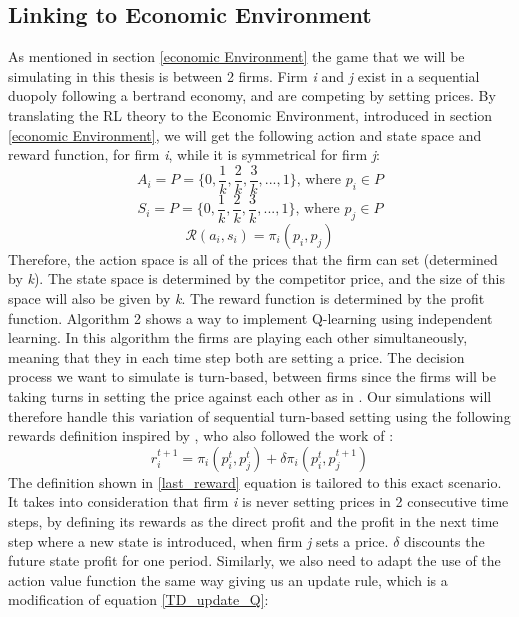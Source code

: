 \documentclass{article}
\begin{document}
\subsection{Linking to Economic Environment}
\label{siste Q teori afsnit}
As mentioned in section \ref{economic Environment} the game that we will be simulating in this thesis is between 2 firms. Firm \textit{i} and \textit{j} exist in a sequential duopoly following a bertrand economy, and are competing by setting prices.
By translating the RL theory to the Economic Environment, introduced in section \ref{economic Environment}, we will get the following action and state space and reward function, for firm \textit{i}, while it is symmetrical for firm \textit{j}:
$$A_i = P = \{0, \frac{1}{k}, \frac{2}{k}, \frac{3}{k},...,1\} \text{,  where }p_i\in P$$
$$S_i=P=\{0, \frac{1}{k}, \frac{2}{k}, \frac{3}{k},...,1\} \text{,  where }p_j\in P$$ 
$$\mathcal{R}(a_i,s_i) = \pi_i(p_i,p_j)$$
Therefore, the action space is all of the prices that the firm can set (determined by \textit{k}). The state space is determined by the competitor price, and the size of this space will also be given by \textit{k}. The reward function is determined by the profit function.
\newline
Algorithm 2 shows a way to implement Q-learning using independent learning. In this algorithm the firms are playing each other simultaneously, meaning that they in each time step both are setting a price. 
The decision process we want to simulate is turn-based, between firms since the firms will be taking turns in setting the price against each other as in \cite{Klein2021}. 
\newline 
Our simulations will therefore handle this variation of sequential turn-based setting using the following rewards definition inspired by \cite{Julius2023}, who also followed the work of \cite{Klein2021}: 
\begin{equation}
\label{last_reward}
    r_i^{t+1} = \pi_i(p^t_i,p^t_j) + \delta\pi_i(p_i^t,p_j^{t+1})
\end{equation}
The definition shown in \ref{last_reward} equation is tailored to this exact scenario. It takes into consideration that firm \textit{i} is never setting prices in 2 consecutive time steps, by defining its rewards as the direct profit and the profit in the next time step where a new state is introduced, when firm \textit{j} sets a price. $\delta$ discounts the future state profit for one period. Similarly, we also need to adapt the use of the action value function the same way giving us an update rule, which is a modification of equation \ref{TD_update_Q}:
\end{document}
